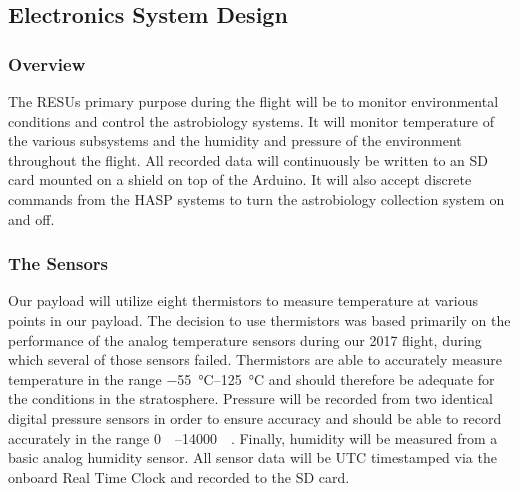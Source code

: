 \subsection{Electronics System Design}
\label{sec:Electronics}

\subsubsection{Overview}

The RESUs primary purpose during the flight will be to monitor environmental conditions and control the astrobiology systems. It will monitor temperature of the various subsystems and the humidity and pressure of the environment throughout the flight. All recorded data will continuously be written to an SD card mounted on a shield on top of the Arduino. It will also accept discrete commands from the HASP systems to turn the astrobiology collection system on and off.

\subsubsection{The Sensors}

Our payload will utilize eight thermistors to measure temperature at various points in our payload. The decision to use thermistors was based primarily on the performance of the analog temperature sensors during our 2017 flight, during which several of those sensors failed. Thermistors are able to accurately measure temperature in the range \SIrange{-55}{125}{\celsius} and should therefore be adequate for the conditions in the stratosphere. Pressure will be recorded from two identical digital pressure sensors in order to ensure accuracy and should be able to record accurately in the range \SIrange{0}{14000}{\milli\bara}. Finally, humidity will be measured from a basic analog humidity sensor. All sensor data will be UTC timestamped via the onboard Real Time Clock and recorded to the SD card.




